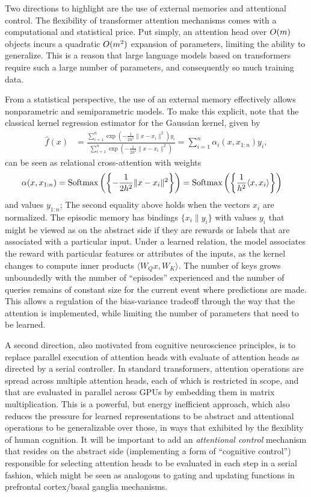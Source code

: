 Two directions to highlight are the use of external memories and attentional control. The flexibility of transformer attention mechanisms comes with a computational and statistical price. Put simply, an attention head over 
$O(m)$ objects incurs a quadratic $O(m^2)$ expansion of parameters, limiting the ability to generalize. This is a reason that large language models based on transformers require such a large number of parameters, and consequently so much training data. 

From a statistical perspective, the use of an external memory effectively allows nonparametric and semiparametric models. To make this explicit, note that the classical kernel regression estimator for the Gaussian kernel,
given by
\begin{align*}
  \hat f(x) &= \frac{\sum_{i=1}^n \exp\left(-\frac{1}{2h^2} \|x-x_i\|^2\right) y_i}{\sum_{i=1}^n \exp\left(-\frac{1}{2h^2} \|x-x_i\|^2\right)} 
  = \sum_{i=1}^n \alpha_i(x, x_{1:n}) y_i,
\end{align*}
can be seen as relational cross-attention with weights
\begin{align*}
    \alpha(x, x_{1:n}) &= \Softmax\left(\left\{-\frac{1}{2h^2}\|x-x_i\|^2\right\}\right) 
    = \Softmax\left(\left\{\frac{1}{h^2}\langle x, x_i\rangle\right\}\right)
\end{align*}
and values $y_{1:n}$; The second equality above holds when the vectors $x_i$ are normalized.
The episodic memory has bindings $\{x_i\| y_i\}$ with values $y_i$ that 
might be viewed as on the abstract side if they are rewards or labels that are associated with 
a particular input. Under a learned relation, the model associates the reward with particular features or attributes of the inputs, as the kernel changes to compute inner products $\langle W_Q x, W_K \rangle$. 
The number of keys grows unboundedly with the number of ``episodes'' experienced 
and the number of queries remains of constant size for the current event where predictions are made.
This allows a regulation of the bias-variance tradeoff through the way that the attention is implemented, 
while limiting the number of parameters that need to be learned.

A second direction, also motivated from cognitive neuroscience principles, is to replace 
parallel execution of attention heads with evaluate of attention heads as directed by a serial controller. 
In standard transformers, attention operations are spread across multiple attention heads,
each of which is restricted in scope, and that are evaluated in parallel across GPUs by embedding them in matrix multiplication. This is a powerful, but energy inefficient approach, which also reduces the pressure for learned representations to be abstract and attentional operations to be generalizable over those, in ways that exhibited by the flexiblity of human cognition.  It will be important to add an {\it attentional control} mechanism that resides on the abstract side (implementing a form of ``cognitive control'') responsible for selecting attention heads to be evaluated in each step in a serial fashion, which might be seen as analogous to gating and updating functions 
in prefrontal cortex/basal ganglia mechanisms. 

